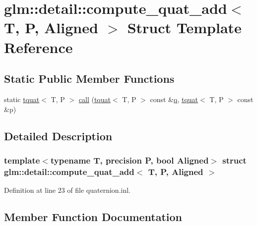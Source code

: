 \hypertarget{structglm_1_1detail_1_1compute__quat__add}{}\section{glm\+::detail\+::compute\+\_\+quat\+\_\+add$<$ T, P, Aligned $>$ Struct Template Reference}
\label{structglm_1_1detail_1_1compute__quat__add}
\subsection*{Static Public Member Functions}
\begin{DoxyCompactItemize}
\item 
static \mbox{\hyperlink{structglm_1_1tquat}{tquat}}$<$ T, P $>$ \mbox{\hyperlink{structglm_1_1detail_1_1compute__quat__add_afa9fcc5ea4b99f8c5d5f5c0f81b833e2}{call}} (\mbox{\hyperlink{structglm_1_1tquat}{tquat}}$<$ T, P $>$ const \&\mbox{\hyperlink{glad_8h_a514729309336df22bcc8eda979d6ced4}{q}}, \mbox{\hyperlink{structglm_1_1tquat}{tquat}}$<$ T, P $>$ const \&p)
\end{DoxyCompactItemize}


\subsection{Detailed Description}
\subsubsection*{template$<$typename T, precision P, bool Aligned$>$\newline
struct glm\+::detail\+::compute\+\_\+quat\+\_\+add$<$ T, P, Aligned $>$}



Definition at line 23 of file quaternion.\+inl.



\subsection{Member Function Documentation}
\mbox{\label{structglm_1_1detail_1_1compute__quat__add_afa9fcc5ea4b99f8c5d5f5c0f81b833e2}} 
